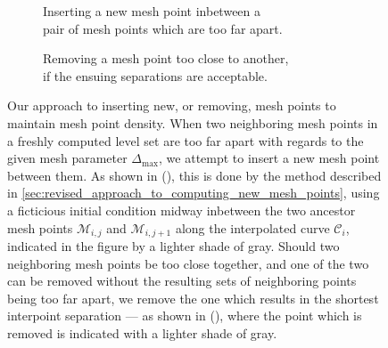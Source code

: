 \begin{figure}[htpb]
    \centering
    \begin{subfigure}[b]{0.475\textwidth}
        \centering
        \resizebox{0.9\linewidth}{!}%
        {}
        \caption[]{{\small Inserting a new mesh point inbetween a
        \\\phantom{(a)} pair of mesh points which are too far apart.}}
        \label{fig:mesh_management_pure_insertion}
    \end{subfigure}
    \begin{subfigure}[b]{0.475\textwidth}
        \centering
        \resizebox{0.9\linewidth}{!}%
        {}
        \caption[]{{\small Removing a mesh point too close to another,
        \\\phantom{(b)} if the ensuing separations are acceptable.}}
        \label{fig:mesh_management_pure_deletion}
    \end{subfigure}
    \caption[Our approach to inserting new, or removing, mesh points to
    maintain mesh point density]
    {Our approach to inserting new, or removing, mesh points to maintain
        mesh point density. When two neighboring mesh points in a freshly
        computed level set are too far apart with regards to the given mesh
        parameter $\Delta_{\max}$, we attempt to insert a new mesh point
        between them. As shown in
        (), this is done by
        the method described in
        \cref{sec:revised_approach_to_computing_new_mesh_points}, using a
        ficticious initial condition midway inbetween the two ancestor mesh
        points $\mathcal{M}_{i,j}$ and $\mathcal{M}_{i,j+1}$ along the
        interpolated curve $\mathcal{C}_{i}$, indicated in the figure by
        a lighter shade of gray. Should two neighboring mesh points
        be too close together, and one of the two can be removed without the
        resulting sets of neighboring points being too far apart, we remove
        the one which results in the shortest interpoint separation --- as
        shown in (), where the point
        which is removed is indicated with a lighter shade of gray.
    }
    \label{fig:mesh_management_insertion_and_deletion}
\end{figure}
